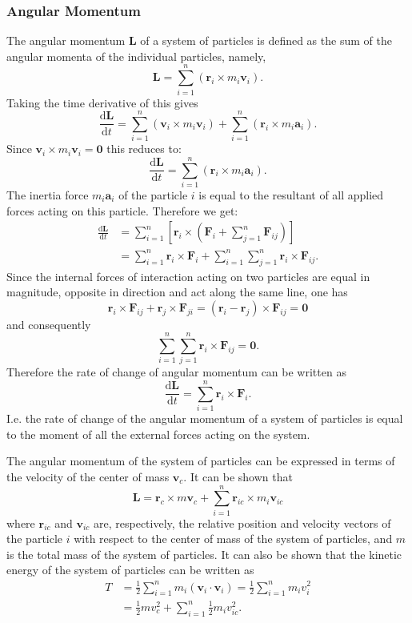 \subsubsection{Angular Momentum}
The angular momentum $\textbf{L}$ of a system of particles is defined as the sum of the angular momenta of the individual particles, namely,
\[ 
\textbf{L} = \sum_{i = 1}^{n} \left( \textbf{r}_i \times m_i \textbf{v}_i \right)
.\]
Taking the time derivative of this gives
\[ 
\frac{\mathrm{d}\textbf{L}}{\mathrm{d}t} = \sum_{i = 1}^{n} \left( \textbf{v}_i \times m_i \textbf{v}_i \right) + \sum_{i = 1}^{n} \left( \textbf{r}_i \times m_i \textbf{a}_i \right)
.\]
Since $\textbf{v}_i \times m_i \textbf{v}_i = \textbf{0}$ this reduces to:
\[ 
  \frac{\mathrm{d}\textbf{L}}{\mathrm{d}t} = \sum_{i = 1}^{n} \left( \textbf{r}_i \times m_i \textbf{a}_i \right)
.\]
The inertia force $m_i \textbf{a}_i$ of the particle $i$ is equal to the resultant of all applied forces acting on this particle. Therefore we get:
\begin{align*}
  \frac{\mathrm{d}\textbf{L}}{\mathrm{d}t} &= \sum_{i = 1}^{n} \left[ \textbf{r}_i \times \left( \textbf{F}_i + \sum_{j = 1}^{n} \textbf{F}_{ij} \right) \right] \\
  &= \sum_{i = 1}^{n} \textbf{r}_i \times \textbf{F}_i + \sum_{i = 1}^{n} \sum_{j = 1}^{n} \textbf{r}_i \times \textbf{F}_{ij}
.\end{align*}
Since the internal forces of interaction acting on two particles are equal in magnitude, opposite in direction and act along the same line, one has
\[ 
\textbf{r}_i \times \textbf{F}_{ij} + \textbf{r}_j \times \textbf{F}_{ji} = \left( \textbf{r}_i - \textbf{r}_j \right) \times \textbf{F}_{ij} = \textbf{0}
\]
and consequently
\[ 
\sum_{i = 1}^{n} \sum_{j = 1}^{n} \textbf{r}_i \times \textbf{F}_{ij} = \textbf{0}
.\]
Therefore the rate of change of angular momentum can be written as
\[ 
\frac{\mathrm{d}\textbf{L}}{\mathrm{d}t} = \sum_{i = 1}^{n} \textbf{r}_i \times \textbf{F}_i
.\]
I.e. the rate of change of the angular momentum of a system of particles is equal to the moment of all the external forces acting on the system.

The angular momentum of the system of particles can be expressed in terms of the velocity of the center of mass $\textbf{v}_c$. It can be shown that
\[ 
\textbf{L} = \textbf{r}_c \times m \textbf{v}_c + \sum_{i = 1}^{n} \textbf{r}_{ic} \times m_i \textbf{v}_{ic}
\]
where $\textbf{r}_{ic}$ and $\textbf{v}_{ic}$ are, respectively, the relative position and velocity vectors of the particle $i$ with respect to the center of mass of the system of particles, and $m$ is the total mass of the system of particles. It can also be shown that the kinetic energy of the system of particles can be written as
\begin{align*}
  T &= \frac{1}{2} \sum_{i = 1}^{n} m_i \left( \textbf{v}_i \cdot \textbf{v}_i \right) = \frac{1}{2} \sum_{i = 1}^{n} m_i v_i^2 \\
    &= \frac{1}{2} m v_c^2 + \sum_{i = 1}^{n} \frac{1}{2} m_i v_{ic}^2
.\end{align*}


